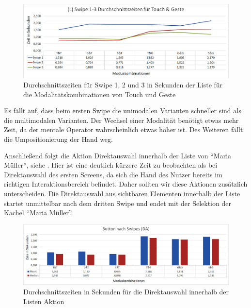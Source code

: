\begin{figure}[ht]
  \centering
  \includegraphics[width=1\textwidth]{img/Swipe1-3_Phone.JPG}
  \caption{Durchschnittszeiten für Swipe 1, 2 und 3 in Sekunden der Liste für die Modalitätskombinationen von Touch und Geste}
  \label{fig:Swipe13Phone}
\end{figure}

Es fällt auf, dass beim ersten Swipe die unimodalen Varianten schneller sind als die multimodalen Varianten. 
Der Wechsel einer Modalität benötigt etwas mehr Zeit, da der mentale Operator wahrscheinlich etwas höher ist.
Des Weiteren fällt die Umpositionierung der Hand weg. 

Anschließend folgt die Aktion Direktauswahl innerhalb der Liste von "`Maria Müller"', siehe . 
Hier ist eine deutlich kürzere Zeit zu beobachten als bei Direktauswahl des ersten Screens, da sich die Hand des Nutzer bereits im richtigen Interaktionsbereich befindet. 
Daher sollten wir diese Aktionen zusätzlich unterscheiden. 
Die Direktauswahl aus sichtbaren Elementen innerhalb der Liste startet unmittelbar nach dem dritten Swipe und endet mit der Selektion der Kachel "`Maria Müller"'.
\begin{figure}[ht]
  \centering
  \includegraphics[width=1\textwidth]{img/DA_Swipe.JPG}
  \caption{Durchschnittszeiten in Sekunden für die Direktauswahl innerhalb der Listen Aktion}
  \label{fig:DA_Swipe}
\end{figure}

